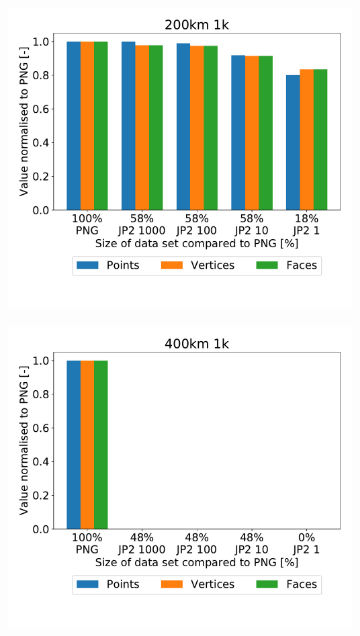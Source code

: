 \begin{figure}[htb]
\begin{subfigure}[b]{0.49\textwidth}
            \caption{}
            \label{fig:recon_120_100_1}
        \end{subfigure}
        \\
        \begin{subfigure}[b]{0.49\textwidth}
            \centering
            \includegraphics[width=\textwidth]{doc/thesis/0_figures/recon/200km_1k}
            \caption{}
            \label{fig:recon_120_200_1}
        \end{subfigure}
        \begin{subfigure}[b]{0.49\textwidth}
            \centering
            \includegraphics[width=\textwidth]{doc/thesis/0_figures/recon/400km_1k}

\end{subfigure}
\end{figure}
